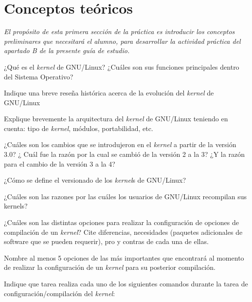 \section{Conceptos teóricos}
\textit{El propósito de esta primera sección de la práctica es introducir
  los conceptos preliminares que necesitará el alumno, para desarrollar la
  actividad práctica del apartado B de la presente guía de estudio.}
\begin{questions}
  \question ¿Qué es el \textit{kernel} de GNU/Linux? ¿Cuáles son sus funciones
  principales dentro del Sistema Operativo?

  \question Indique una breve reseña histórica acerca de la evolución del
  \textit{kernel} de GNU/Linux

  \question Explique brevemente la arquitectura del \textit{kernel} de GNU/Linux
  teniendo en cuenta: tipo de \textit{kernel}, módulos, portabilidad, etc.

  \question ¿Cuáles son los cambios que se introdujeron en el \textit{kernel} a
  partir de la versión 3.0? ¿ Cuál fue la razón por la cual se cambió de la
  versión 2 a la 3? ¿Y la razón para el cambio de la versión 3 a la 4?

  \question ¿Cómo se define el versionado de los \textit{kernel}s de GNU/Linux?

  \question ¿Cuáles son las razones por las cuáles los usuarios de
  GNU/Linux recompilan sus kernels?

  \question ¿Cuáles son las distintas opciones para realizar la
  configuración de opciones de compilación de un \textit{kernel}? Cite diferencias,
  necesidades (paquetes adicionales de software que se pueden requerir),
  pro y contras de cada una de ellas.

  \question Nombre al menos 5 opciones de las más importantes que
  encontrará al momento de realizar la configuración de un \textit{kernel} para su
  posterior compilación.

  \question Indique que tarea realiza cada uno de los siguientes comandos
  durante la tarea de configuración/compilación del \textit{kernel}:

\end{questions}
